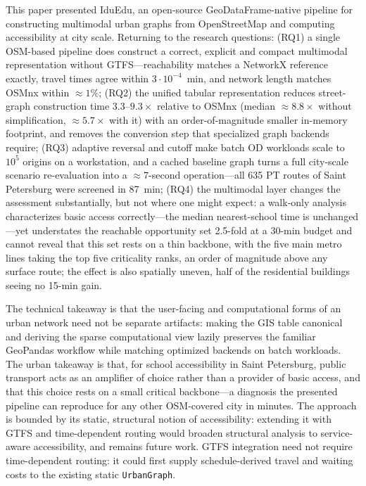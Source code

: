 \documentclass[smartcities,article,submit,moreauthors]{Definitions/mdpi}
\begin{document}
    This paper presented IduEdu, an open-source GeoDataFrame-native pipeline for constructing
    multimodal urban graphs from OpenStreetMap and computing accessibility at city scale.
    Returning to the research questions: (RQ1) a single OSM-based pipeline does construct a correct,
    explicit and compact multimodal representation without GTFS---reachability matches a NetworkX
    reference exactly, travel times agree within $3\cdot10^{-4}$~min, and network length matches OSMnx
    within ${\approx}1\%$; (RQ2) the unified tabular representation reduces street-graph construction
    time $3.3$--$9.3\times$ relative to OSMnx (median ${\approx}8.8\times$ without simplification,
    ${\approx}5.7\times$ with it) with an order-of-magnitude smaller in-memory footprint, and removes
    the conversion step that specialized graph backends require;
    (RQ3) adaptive reversal and cutoff make batch OD workloads scale to $10^5$ origins on a
    workstation, and a cached baseline graph turns a full city-scale scenario re-evaluation into a
    ${\approx}7$-second operation---all 635 PT routes of Saint Petersburg were screened in 87~min;
    (RQ4) the multimodal layer changes the assessment substantially, but not where one might expect: a
    walk-only analysis characterizes basic access correctly---the median nearest-school time is
    unchanged---yet understates the reachable opportunity set 2.5-fold at a 30-min budget and cannot
    reveal that this set rests on a thin backbone, with the five main metro lines taking the top five
    criticality ranks, an order of magnitude above any surface route; the effect is also spatially
    uneven, half of the residential buildings seeing no 15-min gain.

    The technical takeaway is that the user-facing and computational forms of an urban network need not
    be separate artifacts: making the GIS table canonical and deriving the sparse computational view
    lazily preserves the familiar GeoPandas workflow while matching optimized backends on batch
    workloads.
    The urban takeaway is that, for school accessibility in Saint Petersburg, public transport acts as
    an amplifier of choice rather than a provider of basic access, and that this choice rests on a
    small critical backbone---a diagnosis the presented pipeline can reproduce for any other
    OSM-covered city in minutes.
    The approach is bounded by its static, structural notion of accessibility: extending it with GTFS
    and time-dependent routing would broaden structural analysis to service-aware accessibility, and
    remains future work.
    GTFS integration need not require time-dependent routing: it could first supply schedule-derived travel
    and waiting costs to the existing static \texttt{UrbanGraph}.
\end{document}
